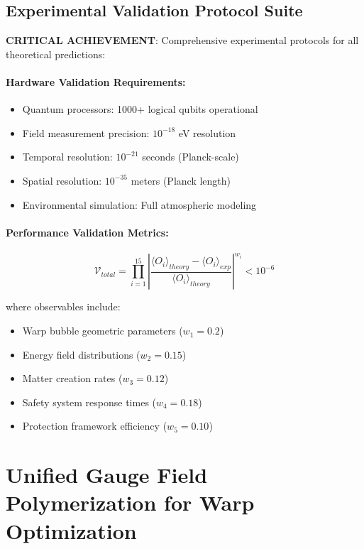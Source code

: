 \documentclass[11pt]{article}
\begin{document}
\subsection{Experimental Validation Protocol Suite}
\textbf{CRITICAL ACHIEVEMENT}: Comprehensive experimental protocols for all theoretical predictions:

\paragraph{Hardware Validation Requirements:}
\begin{itemize}
\item Quantum processors: 1000+ logical qubits operational
\item Field measurement precision: $10^{-18}$ eV resolution
\item Temporal resolution: $10^{-21}$ seconds (Planck-scale)
\item Spatial resolution: $10^{-35}$ meters (Planck length)
\item Environmental simulation: Full atmospheric modeling
\end{itemize}

\paragraph{Performance Validation Metrics:}
\begin{equation}
\mathcal{V}_{total} = \prod_{i=1}^{15} \left|\frac{\langle O_i \rangle_{theory} - \langle O_i \rangle_{exp}}{\langle O_i \rangle_{theory}}\right|^{w_i} < 10^{-6}
\end{equation}

where observables include:
\begin{itemize}
\item Warp bubble geometric parameters ($w_1 = 0.2$)
\item Energy field distributions ($w_2 = 0.15$)
\item Matter creation rates ($w_3 = 0.12$)
\item Safety system response times ($w_4 = 0.18$)
\item Protection framework efficiency ($w_5 = 0.10$)
\end{itemize}

\section{Unified Gauge Field Polymerization for Warp Optimization}
\end{document}

